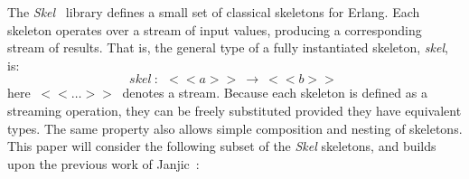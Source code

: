 \documentclass[final]{jfp1}
\newcommand{\stream}[1]{~<\!\!<#1>\!\!>~}
\begin{document}
The \emph{Skel}~\cite{hlpp} library defines a small set of classical skeletons
for Erlang.  Each skeleton operates over a stream of input values, producing a
corresponding stream of results.  
That is, the general type of a fully
instantiated skeleton, \emph{skel}, is:
$$skel ~: ~\stream{a} \rightarrow \stream{b} $$
here $\stream{\ldots}$ denotes a stream. 
Because each skeleton is defined as a
streaming operation, they can be freely substituted provided they have
equivalent types.  The same property also allows simple composition and nesting
of skeletons. This paper will consider the following subset of the \emph{Skel}
skeletons, and builds upon the previous work of Janjic~\cite{parco2015}:
\end{document}
